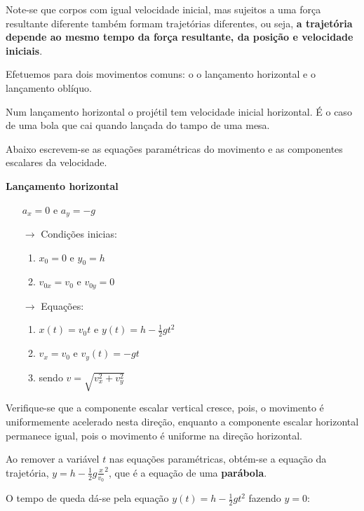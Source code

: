 \documentclass[a4paper,11pt,oneside]{report}
\begin{document}
Note-se que corpos com igual velocidade inicial, mas sujeitos a uma força 
resultante diferente também formam trajetórias diferentes, ou seja, 
\textbf{a trajetória depende ao mesmo tempo da força resultante, da posição e 
velocidade iniciais}.

Efetuemos para dois movimentos comuns: o {\Large o lançamento horizontal} e o 
{\Large lançamento oblíquo}.

Num lançamento horizontal o projétil tem velocidade inicial horizontal. 
É o caso de uma bola que cai quando lançada do tampo de uma mesa.

Abaixo escrevem-se as equações paramétricas do movimento
e as componentes escalares da velocidade.

\hrulefill
\begin{center}
    \textbf{Lançamento horizontal}
\end{center}
\begin{itemize}
\centering
    \item[] $a_x = 0$ e $a_y = -g$
    \item[$\rightarrow$] Condições inicias:
    \begin{enumerate}
        \item $x_0 = 0$ e $y_0 = h$
        \item $v_{0x} = v_0$ e $v_{0y} = 0$
    \end{enumerate}
    \item[$\rightarrow$] Equações:
    \begin{enumerate}
        \item $x(t) = v_0 t$ e $y(t) = h - \frac{1}{2} g t^2$
        \item $v_x = v_0$ e $v_y (t) = -g t$
        \item sendo $v = \sqrt{v_{x}^{2} + v_{y}^{2}}$
    \end{enumerate}
\end{itemize}
\hrulefill

Verifique-se que a componente escalar vertical {\Large cresce}, pois, o movimento 
é uniformemente acelerado nesta direção, enquanto a componente escalar 
horizontal permanece igual, pois o movimento é uniforme na direção horizontal.

Ao remover a variável $t$ nas equações paramétricas, obtém-se a equação da 
trajetória, $y = h - \frac{1}{2}g\frac{x}{v_0}^2$, que é a equação de uma \textbf{parábola}.

O tempo de queda dá-se pela equação $y(t) = h - \frac{1}{2}gt^2$ fazendo $y = 0$:
\end{document}
